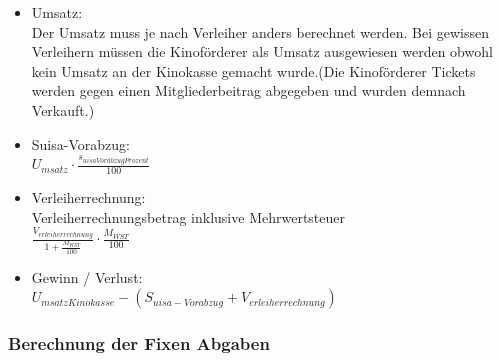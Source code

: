 \documentclass[
]{article}
\providecommand{\tightlist}{%
  \setlength{\itemsep}{0pt}\setlength{\parskip}{0pt}}
\begin{document}
\begin{itemize}
  \begin{itemize}
  \tightlist
  \item
    Umsatz:\\
    Der Umsatz muss je nach Verleiher anders berechnet werden. Bei
    gewissen Verleihern müssen die Kinoförderer als Umsatz ausgewiesen
    werden obwohl kein Umsatz an der Kinokasse gemacht wurde.(Die
    Kinoförderer Tickets werden gegen einen Mitgliederbeitrag abgegeben
    und wurden demnach Verkauft.)
  \item
    Suisa-Vorabzug:\\
    \(U_{msatz}\cdot  \frac {s_{uisaVorabzugProzent}}{100}\)
  \item
    Verleiherrechnung:\\
    Verleiherrechnungsbetrag inklusive Mehrwertsteuer\\
    \(\frac {V_{erleiherrechnung}}{1+\frac{M_{WST}}{100}}\cdot\frac{M_{WST}}{100}\)
  \item
    Gewinn / Verlust:\\
    \(U_{msatzKinokasse} - (S_{uisa-Vorabzug} + V_{erleiherrechnung})\)
  \end{itemize}
\end{itemize}

\subsubsection{Berechnung der Fixen
Abgaben}\label{berechnung-der-fixen-abgaben}
\end{document}
